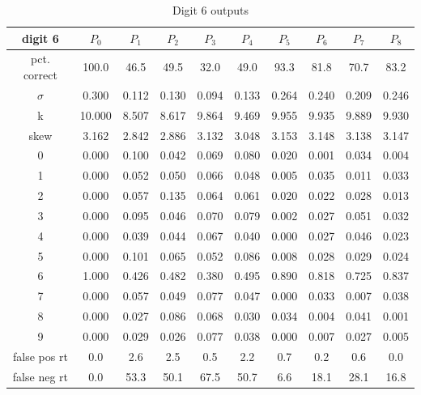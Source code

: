\documentclass[conference]{IEEEtran}
\begin{document}
\begin{table}
\caption{Digit 6 outputs}
\centering
\begin{tabular}{ | c ||  c | c | c | c | c | c | c | c | c |}
 digit 6 & $P_0$ & $P_1$ & $P_2$ & $P_3$ & $P_4$ & $P_5$ & $P_6$ & $P_7$ & $P_8$ \\
\hline \hline
pct. correct  & 100.0 & 46.5 & 49.5 & 32.0 & 49.0 & 93.3 & 81.8 & 70.7 & 83.2 \\
\hline
$\sigma$ & 0.300& 0.112& 0.130& 0.094& 0.133& 0.264& 0.240& 0.209& 0.246 \\
\hline
k & 10.000& 8.507& 8.617& 9.864& 9.469& 9.955& 9.935& 9.889& 9.930 \\
\hline
skew & 3.162& 2.842& 2.886& 3.132& 3.048& 3.153& 3.148& 3.138& 3.147 \\
\hline
0 & 0.000 & 0.100 & 0.042 & 0.069 & 0.080 & 0.020 & 0.001 & 0.034 & 0.004 \\
\hline
1 & 0.000 & 0.052 & 0.050 & 0.066 & 0.048 & 0.005 & 0.035 & 0.011 & 0.033 \\
\hline
2 & 0.000 & 0.057 & 0.135 & 0.064 & 0.061 & 0.020 & 0.022 & 0.028 & 0.013 \\
\hline
3 & 0.000 & 0.095 & 0.046 & 0.070 & 0.079 & 0.002 & 0.027 & 0.051 & 0.032 \\
\hline
4 & 0.000 & 0.039 & 0.044 & 0.067 & 0.040 & 0.000 & 0.027 & 0.046 & 0.023 \\
\hline
5 & 0.000 & 0.101 & 0.065 & 0.052 & 0.086 & 0.008 & 0.028 & 0.029 & 0.024 \\
\hline
6 & 1.000 & 0.426 & 0.482 & 0.380 & 0.495 & 0.890 & 0.818 & 0.725 & 0.837 \\
\hline
7 & 0.000 & 0.057 & 0.049 & 0.077 & 0.047 & 0.000 & 0.033 & 0.007 & 0.038 \\
\hline
8 & 0.000 & 0.027 & 0.086 & 0.068 & 0.030 & 0.034 & 0.004 & 0.041 & 0.001 \\
\hline
9 & 0.000 & 0.029 & 0.026 & 0.077 & 0.038 & 0.000 & 0.007 & 0.027 & 0.005 \\
\hline
false pos rt & 0.0 & 2.6 & 2.5 & 0.5 & 2.2 & 0.7 & 0.2 & 0.6 & 0.0 \\
\hline
false neg rt & 0.0 & 53.3 & 50.1 & 67.5 & 50.7 & 6.6 & 18.1 & 28.1 & 16.8 \\
\hline
\end{tabular}
\end{table}
\end{document}
